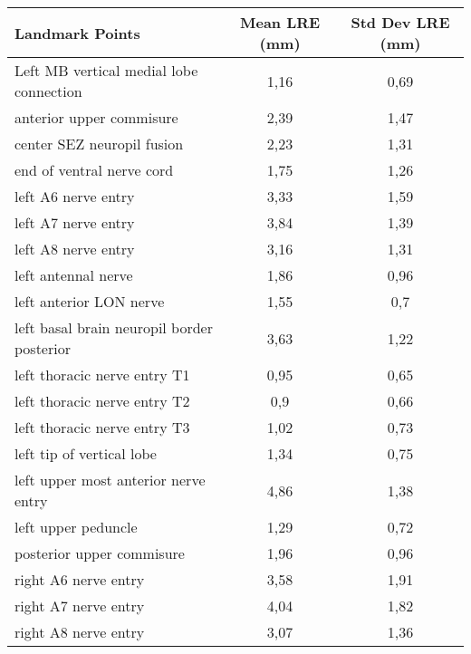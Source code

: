 \begin{tabular}{lcc}
\hline
 Landmark Points                             & Mean LRE (mm) & Std Dev LRE (mm) \\ \hline \hline
 Left MB vertical medial lobe connection     & 1,16          & 0,69             \\
 anterior upper commisure                    & 2,39          & 1,47             \\
 center SEZ neuropil fusion                  & 2,23          & 1,31             \\
 end of ventral nerve cord                   & 1,75          & 1,26             \\
 left A6 nerve entry                         & 3,33          & 1,59             \\
 left A7 nerve entry                         & 3,84          & 1,39             \\
 left A8 nerve entry                         & 3,16          & 1,31             \\
 left antennal nerve                         & 1,86          & 0,96             \\
 left anterior LON nerve                     & 1,55          & 0,7              \\
 left basal brain neuropil border posterior  & 3,63          & 1,22             \\
 left thoracic nerve entry T1                & 0,95          & 0,65             \\
 left thoracic nerve entry T2                & 0,9           & 0,66             \\
 left thoracic nerve entry T3                & 1,02          & 0,73             \\
 left tip of vertical lobe                   & 1,34          & 0,75             \\
 left upper most anterior nerve entry        & 4,86          & 1,38             \\
 left upper peduncle                         & 1,29          & 0,72             \\
 posterior upper commisure                   & 1,96          & 0,96             \\
 right A6 nerve entry                        & 3,58          & 1,91             \\
 right A7 nerve entry                        & 4,04          & 1,82             \\
 right A8 nerve entry                        & 3,07          & 1,36             \\

\end{tabular}
